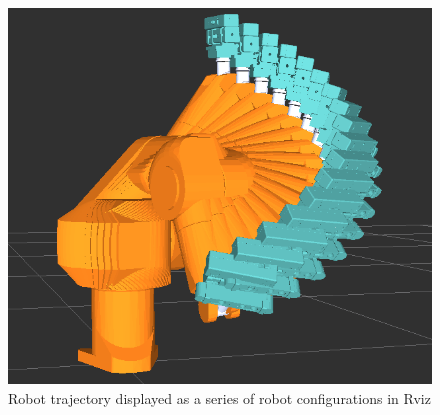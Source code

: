 \begin{figure}[htb]
	\begin{center}
		\includegraphics[scale=0.5,trim=0 0 0 0]{graphics/05_robotics/robot_trajectory.png}%
		\caption{Robot trajectory displayed as a series of robot configurations in Rviz}
		\label{fig:robot_trajectory}
	\end{center}
\end{figure}

